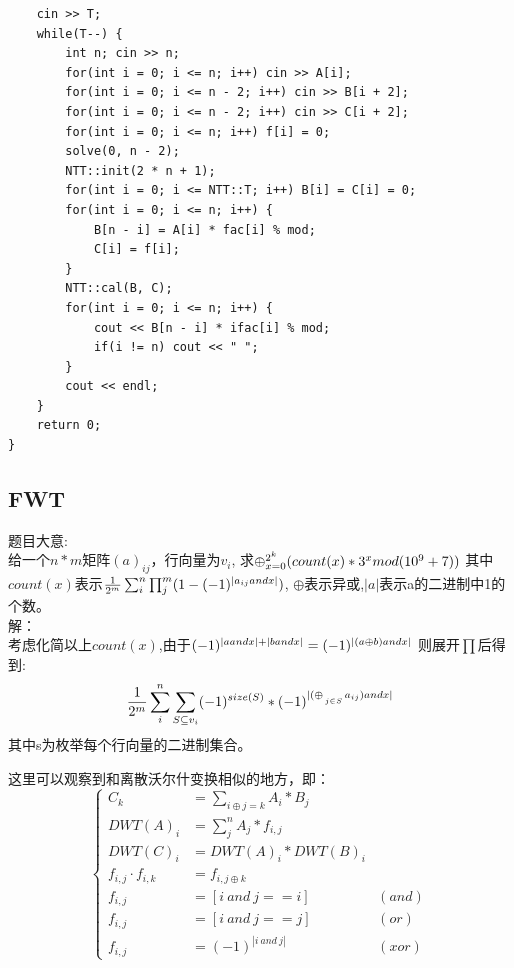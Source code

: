 \documentclass[10pt]{ctexart}
\begin{document}
{\begin{lstlisting}
    cin >> T;
    while(T--) {
        int n; cin >> n;
        for(int i = 0; i <= n; i++) cin >> A[i];
        for(int i = 0; i <= n - 2; i++) cin >> B[i + 2];
        for(int i = 0; i <= n - 2; i++) cin >> C[i + 2];
        for(int i = 0; i <= n; i++) f[i] = 0;
        solve(0, n - 2);
        NTT::init(2 * n + 1);
        for(int i = 0; i <= NTT::T; i++) B[i] = C[i] = 0;
        for(int i = 0; i <= n; i++) {
            B[n - i] = A[i] * fac[i] % mod;
            C[i] = f[i];
        }
        NTT::cal(B, C);
        for(int i = 0; i <= n; i++) {
            cout << B[n - i] * ifac[i] % mod;
            if(i != n) cout << " ";
        }
        cout << endl;
    }
    return 0;
}
\end{lstlisting}



\subsection{FWT}
题目大意:\\ 
给一个$n*m$矩阵$(a)_{ij}$，行向量为$v_i$, 求$\oplus_{x=0}^{2^k}(count(x) * 3^x\space mod(10^9+7))$
其中$count(x)$表示$\frac{1}{2^m}  \sum_i^n \prod_j^m (1-(-1)^{|a_{ij} \space and \space x| })$, $\oplus$表示异或,$|a|$表示a的二进制中1的个数。\\

解：\\
考虑化简以上$count(x)$,由于$(-1)^{|a\space and \space x| + |b\space and\space x|}= (-1)^{|(a \space \oplus \space b) \space and \space x|}$
则展开$\prod$后得到:
$$
\frac{1}{2^m} \sum_i^n \sum_{S \subseteq {v_i}} (-1)^{size(S)} * (-1)^{|(\oplus_{\atop j \in S}a_{ij}) \space and \space x |}
$$
其中s为枚举每个行向量的二进制集合。
  
这里可以观察到和离散沃尔什变换相似的地方，即：\\

\begin{equation*}
\left\{
    \begin{aligned}
        C_k&=\sum_{i\oplus j=k}A_i*B_j \\
        DWT(A)_i&=\sum_j^nA_j*f_{i,j} \\
        DWT(C)_i&=DWT(A)_i*DWT(B)_i\\
        f_{i,j} \cdot f_{i,k} &=f_{i,j\oplus k}\\
        f_{i,j} &= [i \ and \ j == i] \  &(and)\\
        f_{i,j} &= [i \  and \  j == j] \ &(or)\\
        f_{i,j} &= (-1)^{| i \  and \  j |} \ &(xor)
    \end{aligned}
\right.
\end{equation*}

}
\end{document}
